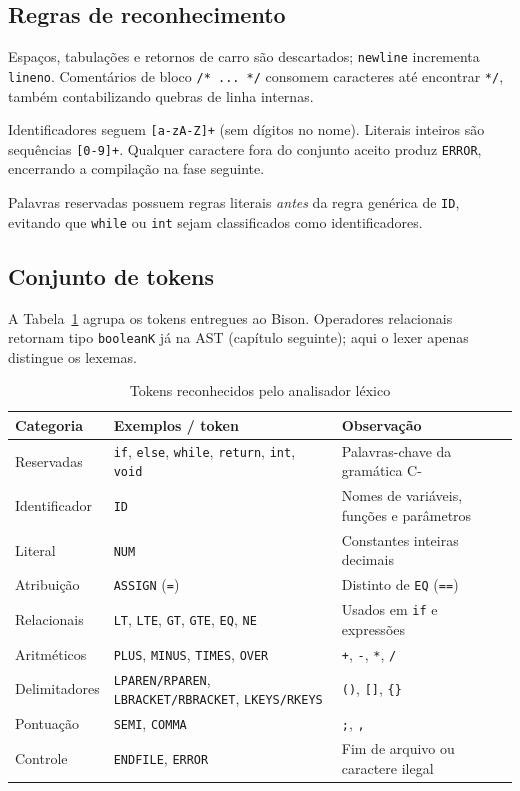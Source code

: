 \documentclass[
	12pt,				%
	openright,			%
	a4paper,			%
	english,			%
	french,				%
	spanish,			%
	brazil,				%
	]{abntex2}
\begin{document}
\subsection{Regras de reconhecimento}

Espaços, tabulações e retornos de carro são descartados; \texttt{newline} incrementa \texttt{lineno}. Comentários de bloco \texttt{/* ... */} consomem caracteres até encontrar \texttt{*/}, também contabilizando quebras de linha internas.

Identificadores seguem \texttt{[a-zA-Z]+} (sem dígitos no nome). Literais inteiros são sequências \texttt{[0-9]+}. Qualquer caractere fora do conjunto aceito produz \texttt{ERROR}, encerrando a compilação na fase seguinte.

Palavras reservadas possuem regras literais \emph{antes} da regra genérica de \texttt{ID}, evitando que \texttt{while} ou \texttt{int} sejam classificados como identificadores.

\subsection{Conjunto de tokens}

A Tabela~\ref{tab:tokens} agrupa os tokens entregues ao Bison. Operadores relacionais retornam tipo \texttt{booleanK} já na AST (capítulo seguinte); aqui o lexer apenas distingue os lexemas.

\begin{table}[H]
\centering
\caption{Tokens reconhecidos pelo analisador léxico}
\label{tab:tokens}
\small
\begin{tabular}{|l|l|p{3.5cm}|}
\hline
\textbf{Categoria} & \textbf{Exemplos / token} & \textbf{Observação} \\
\hline
Reservadas & \texttt{if}, \texttt{else}, \texttt{while}, \texttt{return}, \texttt{int}, \texttt{void} & Palavras-chave da gramática C- \\
\hline
Identificador & \texttt{ID} & Nomes de variáveis, funções e parâmetros \\
\hline
Literal & \texttt{NUM} & Constantes inteiras decimais \\
\hline
Atribuição & \texttt{ASSIGN} (\texttt{=}) & Distinto de \texttt{EQ} (\texttt{==}) \\
\hline
Relacionais & \texttt{LT}, \texttt{LTE}, \texttt{GT}, \texttt{GTE}, \texttt{EQ}, \texttt{NE} & Usados em \texttt{if} e expressões \\
\hline
Aritméticos & \texttt{PLUS}, \texttt{MINUS}, \texttt{TIMES}, \texttt{OVER} & \texttt{+}, \texttt{-}, \texttt{*}, \texttt{/} \\
\hline
Delimitadores & \texttt{LPAREN/RPAREN}, \texttt{LBRACKET/RBRACKET}, \texttt{LKEYS/RKEYS} & \texttt{()}, \texttt{[]}, \texttt{\{\}} \\
\hline
Pontuação & \texttt{SEMI}, \texttt{COMMA} & \texttt{;}, \texttt{,} \\
\hline
Controle & \texttt{ENDFILE}, \texttt{ERROR} & Fim de arquivo ou caractere ilegal \\
\hline
\end{tabular}
\end{table}
\end{document}

